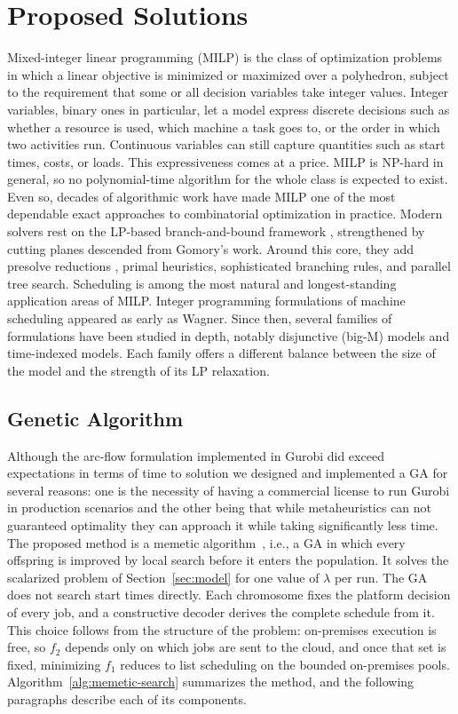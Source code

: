\documentclass[conference]{IEEEtran}
\begin{document}
\section{Proposed Solutions}
\label{sec:solutions}
Mixed-integer linear programming (MILP) is the class of optimization problems in which a linear objective is minimized or maximized over a polyhedron, subject to the requirement that some or all decision variables take integer values.\cite{Nemhauser88} Integer variables, binary ones in particular, let a model express discrete decisions such as whether a resource is used, which machine a task goes to, or the order in which two activities run. Continuous variables can still capture quantities such as start times, costs, or loads. This expressiveness comes at a price. MILP is NP-hard in general\cite{Karp1972}, so no polynomial-time algorithm for the whole class is expected to exist. Even so, decades of algorithmic work have made MILP one of the most dependable exact approaches to combinatorial optimization in practice. Modern solvers rest on the LP-based branch-and-bound framework\cite{Land1960} , strengthened by cutting planes descended from Gomory’s work\cite{bams/1183522679}. Around this core, they add presolve reductions , primal heuristics, sophisticated branching rules, and parallel tree search.
Scheduling is among the most natural and longest-standing application areas of MILP. Integer programming formulations of machine scheduling appeared as early as Wagner\cite{Wagner1959}. Since then, several families of formulations have been studied in depth, notably disjunctive (big-M) models and time-indexed models. Each family offers a different balance between the size of the model and the strength of its LP relaxation\cite{Ku2016}.

\subsection{Genetic Algorithm}

Although the arc-flow formulation implemented in Gurobi did exceed expectations in terms of time to solution we designed and implemented a GA for several reasons: one is the necessity of having a commercial license to run Gurobi in production scenarios and the other being that while metaheuristics can not guaranteed optimality they can approach it while taking significantly less time.
The proposed method is a memetic algorithm~\cite{Moscato1989}, i.e., a GA in which every offspring is improved by local search before it enters the population. It solves the scalarized problem of Section~\ref{sec:model} for one value of $\lambda$ per run. The GA does not search start times directly. Each chromosome fixes the platform decision of every job, and a constructive decoder derives the complete schedule from it. This choice follows from the structure of the problem: on-premises execution is free, so $f_2$ depends only on which jobs are sent to the cloud, and once that set is fixed, minimizing $f_1$ reduces to list scheduling on the bounded on-premises pools. Algorithm~\ref{alg:memetic-search} summarizes the method, and the following paragraphs describe each of its components.
\end{document}
